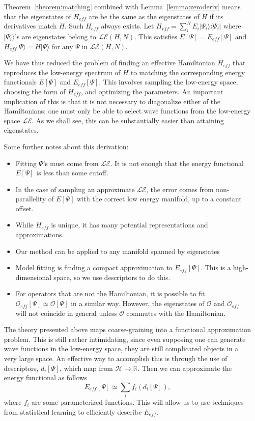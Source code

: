 \documentclass[aps, prb, 11pt]{revtex4-1}
\begin{document}
Theorem~\ref{theorem:matching} combined with Lemma~\ref{lemma:zeroderiv} means that the eigenstates of $H_{eff}$ are be the same as the eigenstates of $H$ if its derivatives match $H$. 
Such $H_{eff}$ always exists. 
Let $H_{eff} = \sum_{i}^N E_i |\Psi_i\rangle \langle \Psi_i|$ where $|\Psi_i\rangle$'s are eigenstates belong to $\mathcal{LE}(H,N)$. This satisfies $E[\Psi] = E_{eff}[\Psi]$ and $H_{eff}|\Psi\rangle = H |\Psi \rangle$ for any $\Psi$ in $\mathcal{LE}(H,N)$.  

We have thus reduced the problem of finding an effective Hamiltonian $H_{eff}$ that reproduces the low-energy spectrum of $H$ to matching the corresponding energy functionals $E[\Psi]$ and $E_{eff}[\Psi]$. 
This involves sampling the low-energy space, choosing the form of $H_{eff}$, and optimizing the parameters.
An important implication of this is that it is not necessary to diagonalize either of the Hamiltonians; one must only be able to select wave functions from the low-energy space $\mathcal{LE}$.
As we shall see, this can be substantially easier than attaining eigenstates.

Some further notes about this derivation:
\begin{itemize}
\item Fitting $\Psi$'s must come from $\mathcal{LE}$. It is not enough that the energy functional $E[\Psi]$ is less than some cutoff.
\item In the case of sampling an approximate $\mathcal{LE}$, the error comes from non-parallelity of $E[\Psi]$ with the correct low energy manifold, up to a constant offset.
\item While $H_{eff}$ is unique, it has many potential representations and approximations. 
\item Our method can be applied to any manifold spanned by eigenstates
\item Model fitting is finding a compact approximation to $E_{eff}[\Psi]$. This is a high-dimensional space, so we use descriptors to do this.	
\item For operators that are not the Hamiltonian, it is possible to fit $\mathcal{O}_{eff}[\Psi] \simeq {\mathcal O}[\Psi]$ in a similar way. However, the eigenstates of ${\mathcal O}$ and ${\mathcal O}_{eff}$ will not coincide in general unless $\mathcal{O}$ commutes with the Hamiltonian.
\end{itemize}


The theory presented above maps coarse-graining into a functional approximation problem. 
This is still rather intimidating, since even supposing one can generate wave functions in the low-energy space, they are still complicated objects in a very large space.
An effective way to accomplish this is through the use of descriptors, $d_i[\Psi]$, which map from ${\mathcal H} \rightarrow \mathbb{R}$.
Then we can approximate the energy functional as follows
\begin{equation}
E_{eff}[\Psi] \simeq \sum_i f_i(d_i[\Psi]),
\end{equation}
where $f_i$ are some parameterized functions.
This will allow us to use techniques from statistical learning to efficiently describe $E_{eff}$. 
\end{document}
